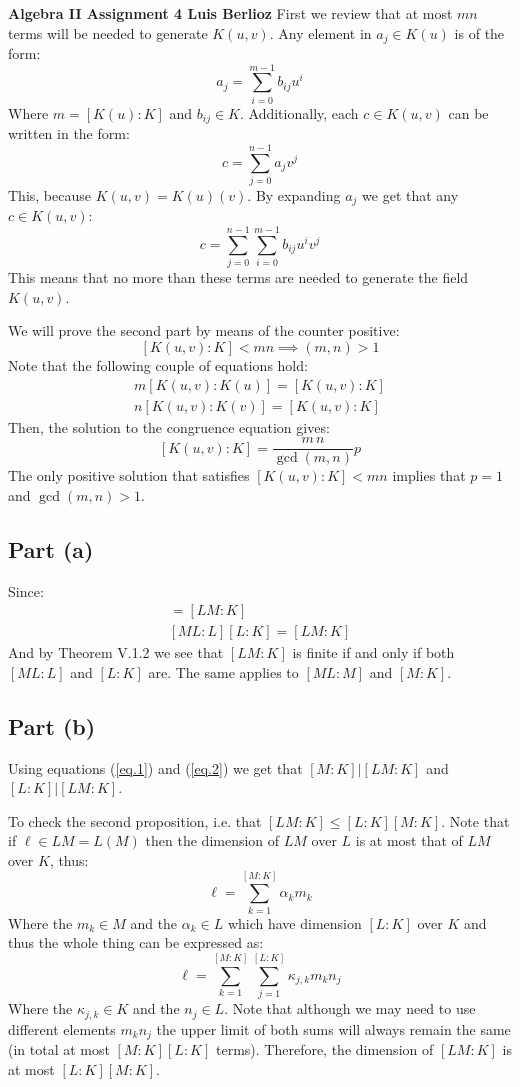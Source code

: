 \noindent\textbf{Algebra II Assignment 4 \hspace{\fill} Luis Berlioz}
First we review that at most $mn$ terms will be needed to generate $K(u,v)$.
Any element in $a_j\in K(u)$ is of the form:
$$a_j = \sum_{i=0}^{m-1} b_{ij} u^i$$
Where $m=[K(u):K]$ and $b_{ij}\in K$. 
Additionally, each $c\in K(u,v)$ can be written in the form:
$$c= \sum_{j=0}^{n-1} a_{j} v^j$$
This, because $K(u,v)= K(u)(v)$. By expanding $a_j$ we get that any $c\in K(u,v)$:
$$c= \sum_{j=0}^{n-1} \sum_{i=0}^{m-1} b_{ij} u^i v^j$$
This means that no more than these terms are needed to generate the field $K(u,v)$.

We will prove the second part by means of the counter positive: 
$$[K(u,v):K]<mn \implies (m,n)>1$$ 
Note that the following couple of equations hold:
\begin{gather*}
m[K(u,v):K(u)] = [K(u,v):K]\\
n[K(u,v):K(v)] = [K(u,v):K]
\end{gather*}
Then, the solution to the congruence equation gives:
$$[K(u,v):K] = \frac{m\, n}{\gcd(m,n)}p$$
The only positive solution that satisfies $[K(u,v):K]<mn$  implies that $p=1$ and $\gcd(m,n)>1$. 

\subsection*{Part (a)}
Since:
\begin{gather} 
    [ML:M][M:K] = [LM:K]\label{eq.1}\\
    [ML:L][L:K] = [LM:K]\label{eq.2}
\end{gather}
And by Theorem V.1.2 we see that $[LM:K]$ is finite if and only if both $[ML:L]$ and $[L:K]$ are.
The same applies to $[ML:M]$ and $[M:K]$. 

\subsection*{Part (b)}
Using equations (\ref{eq.1}) and (\ref{eq.2}) we get that $[M:K]\Big| [LM:K]$ and $[L:K]\Big| [LM:K]$. 

To check the second proposition, i.e. that $[LM:K]\leq [L:K][M:K]$. Note that if $\ell \in LM = L(M)$ then the dimension of $LM$ over $L$ is at most that of $LM$ over $K$, thus:
$$\ell = \sum_{k=1}^{[M:K]}\alpha_k m_k$$
Where the  $m_k\in M$ and the $\alpha_k \in L$ which have dimension $[L:K]$ over $K$ and thus the whole thing can be expressed as:
$$\ell =  \sum_{k=1}^{[M:K]}\sum_{j=1}^{[L:K]}\kappa_{j,k}m_kn_j$$
Where the $\kappa_{j,k}\in K$ and the $n_j\in L$. 
Note that although we may need to use different elements $m_kn_j$ the upper limit of both sums will always remain the same (in total at most $[M:K][L:K]$ terms). 
Therefore, the dimension of $[LM:K]$ is at most $[L:K][M:K]$. 
